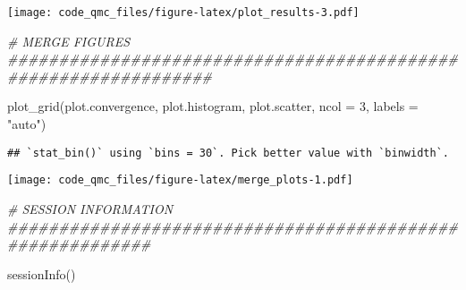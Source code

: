 \documentclass[
  11pt,
]{article}
\newenvironment{Shaded}{\begin{snugshade}}{\end{snugshade}}
\newcommand{\AttributeTok}[1]{\textcolor[rgb]{0.77,0.63,0.00}{#1}}
\newcommand{\CommentTok}[1]{\textcolor[rgb]{0.56,0.35,0.01}{\textit{#1}}}
\newcommand{\DecValTok}[1]{\textcolor[rgb]{0.00,0.00,0.81}{#1}}
\newcommand{\FunctionTok}[1]{\textcolor[rgb]{0.00,0.00,0.00}{#1}}
\newcommand{\NormalTok}[1]{#1}
\newcommand{\StringTok}[1]{\textcolor[rgb]{0.31,0.60,0.02}{#1}}
\begin{document}
\texttt{[image: code\_qmc\_files/figure-latex/plot\_results-3.pdf]}

\begin{Shaded}
\begin{Highlighting}[]
\CommentTok{\# MERGE FIGURES \#\#\#\#\#\#\#\#\#\#\#\#\#\#\#\#\#\#\#\#\#\#\#\#\#\#\#\#\#\#\#\#\#\#\#\#\#\#\#\#\#\#\#\#\#\#\#\#\#\#\#\#\#\#\#\#\#\#\#\#\#\#\#\#}

\FunctionTok{plot\_grid}\NormalTok{(plot.convergence, plot.histogram, plot.scatter, }\AttributeTok{ncol =} \DecValTok{3}\NormalTok{, }\AttributeTok{labels =} \StringTok{"auto"}\NormalTok{)}
\end{Highlighting}
\end{Shaded}

\begin{verbatim}
## `stat_bin()` using `bins = 30`. Pick better value with `binwidth`.
\end{verbatim}

\texttt{[image: code\_qmc\_files/figure-latex/merge\_plots-1.pdf]}

\newpage

\begin{Shaded}
\begin{Highlighting}[]
\CommentTok{\# SESSION INFORMATION \#\#\#\#\#\#\#\#\#\#\#\#\#\#\#\#\#\#\#\#\#\#\#\#\#\#\#\#\#\#\#\#\#\#\#\#\#\#\#\#\#\#\#\#\#\#\#\#\#\#\#\#\#\#\#\#\#\#}

\FunctionTok{sessionInfo}\NormalTok{()}
\end{Highlighting}
\end{Shaded}
\end{document}
